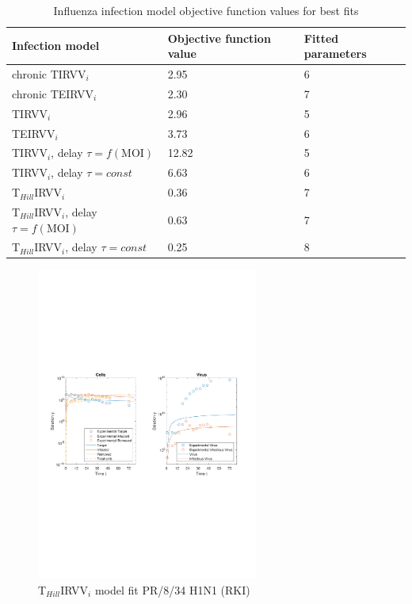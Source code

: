 \begin{table}[h!]
\centering
\caption[Influenza infection model objective function values for best fits]{Influenza infection model objective function values for best fits}
\label{table:ModelObjFunction}

\begin{tabular}{p{8cm} p{3cm} p{2.5cm}}
\hline 
\textbf{Infection model} & \textbf{Objective function value} & \textbf{Fitted \mbox{parameters}}\\
\hline
chronic TIRVV$_i$ & 2.95 & 6\\
chronic TEIRVV$_i$ & 2.30 & 7\\
\hline
TIRVV$_i$ & 2.96 & 5\\
TEIRVV$_i$ &  3.73 & 6\\
TIRVV$_i$, delay $\tau = f(\text{MOI})$ & 12.82 & 5\\
TIRVV$_i$, delay $\tau = const$ & 6.63 & 6\\
T$_{Hill}$IRVV$_i$ & 0.36 & 7\\
T$_{Hill}$IRVV$_i$, delay $\tau = f(\text{MOI})$ & 0.63 & 7\\
T$_{Hill}$IRVV$_i$, delay $\tau = const$ & 0.25 & 8\\
\hline
\end{tabular}
\end{table}

\newpage

\begin{figure}[H]
\begin{center}
\includegraphics[width=0.65\textwidth, trim={1cm 9.8cm 1cm 9.5cm}, clip]{D_chapters/6_appendix/4_ValidationRKI/InfectionDepletionModelTHillIRVViMOI0.025log.pdf}
\caption[T$_{Hill}$IRVV$_i$ model fit for PR/8/34 H1N1 (RKI)]%
{T$_{Hill}$IRVV$_i$ model fit PR/8/34 H1N1 (RKI)}
\label{figure:THillIRVViValidationRKI}
\end{center}
\end{figure}

